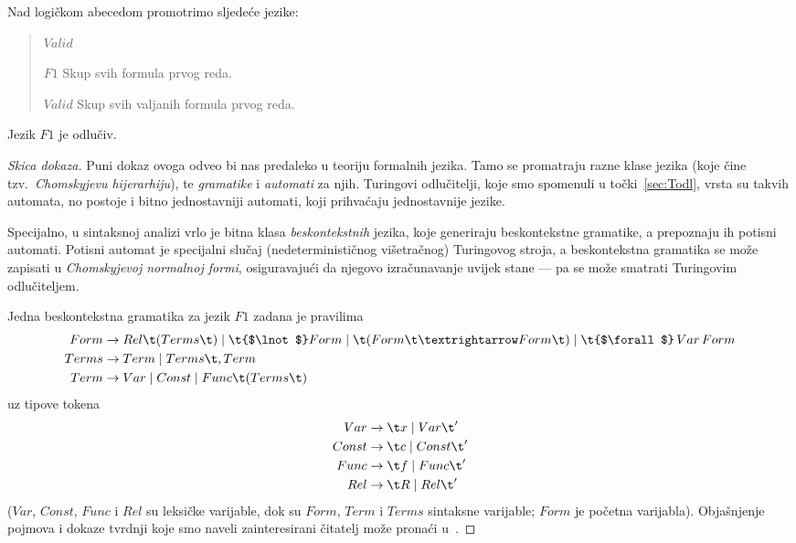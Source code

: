 \begin{definicija}[{name=[jezici svih i valjanih formula prvog reda]}]
Nad logičkom abecedom promotrimo sljedeće jezike:
\begin{quote}
\begin{labeling}{$Valid$}
\item[$F1$] Skup svih formula prvog reda.
\item[$Valid$] Skup svih valjanih formula prvog reda.\qedhere
\end{labeling}
\end{quote}
\end{definicija}

\begin{propozicija}[{name=[odlučivost jezika svih formula prvog reda]}]\label{pp:F1odl}
Jezik $F1$ je odlučiv.
\end{propozicija}
\begin{proof}[Skica dokaza] Puni dokaz ovoga odveo bi nas predaleko u teoriju formalnih jezika. Tamo se promatraju razne klase jezika (koje čine tzv.\ \emph{Chomskyjevu hijerarhiju}), te \emph{gramatike} i \emph{automati} za njih. Turingovi odlučitelji, koje smo spomenuli u točki~\ref{sec:Todl}, vrsta su takvih automata, no postoje i bitno jednostavniji automati, koji prihvaćaju jednostavnije jezike.

Specijalno, u sintaksnoj analizi vrlo je bitna klasa \emph{beskontekstnih} jezika, koje generiraju beskontekstne gramatike, a prepoznaju ih potisni automati. Potisni automat je specijalni slučaj (nedeterminističnog višetračnog) Turingovog stroja, a beskontekstna gramatika se može zapisati u \emph{Chomskyjevoj normalnoj formi}, osiguravajući da njegovo izračunavanje uvijek stane --- pa se može smatrati Turingovim odlučiteljem.

Jedna beskontekstna gramatika za jezik $F1$ zadana je pravilima
\begin{align}
    Form&\to Rel\t(Terms\t)\mid\t{$\lnot$} Form\mid\t(Form\t\textrightarrow Form\t)\mid\t{$\forall$}\,Var\,Form\\
    Terms&\to Term\mid Terms\t,Term\\
    Term&\to Var\mid Const\mid Func\t(Terms\t)
\end{align}
uz tipove tokena
    \begin{align}
    Var&\to\t x\mid Var\t'\\
    Const&\to\t c\mid Const\t'\\
    Func&\to\t f\mid Func\t'\\
    Rel&\to\t R\mid Rel\t'
\end{align}
($Var$, $Const$, $Func$ i $Rel$ su leksičke varijable, dok su $Form$, $Term$ i $Terms$ sintaksne varijable; $Form$ je početna varijabla). Objašnjenje pojmova i dokaze tvrdnji koje smo naveli zainteresirani čitatelj može pronaći u~\cite{sipser}.
\end{proof}

